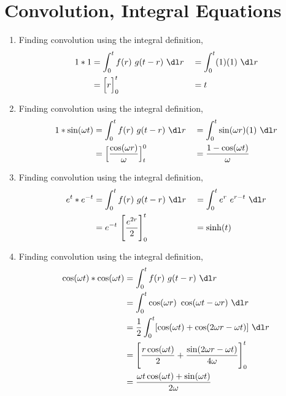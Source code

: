 \section{Convolution, Integral Equations}
\begin{enumerate}
    \item Finding convolution using the integral definition,
          \begin{align}
              1 * 1 & = \int_{0}^{t} f(r)\ g(t - r)\ \dl r &
                    & = \int_{0}^{t} (1)(1)\ \dl r           \\
                    & = \Big[ r \Big]_0^t                  &
                    & = t
          \end{align}

    \item Finding convolution using the integral definition,
          \begin{align}
              1 * \sin(\omega t) & = \int_{0}^{t} f(r)\ g(t - r)\ \dl r    &
                                 & = \int_{0}^{t} \sin(\omega r)(1)\ \dl r   \\
                                 & = \Big[ \frac{\cos(\omega r)}{\omega}
              \Big]_t^0          &
                                 & = \frac{1 - \cos(\omega t)}{\omega}
          \end{align}

    \item Finding convolution using the integral definition,
          \begin{align}
              e^t * e^{-t} & = \int_{0}^{t} f(r)\ g(t - r)\ \dl r         &
                           & = \int_{0}^{t} e^{r}\ e^{r - t}\ \dl r         \\
                           & = e^{-t}\ \Bigg[ \frac{e^{2r}}{2} \Bigg]_0^t &
                           & = \sinh(t)
          \end{align}

    \item Finding convolution using the integral definition,
          \begin{align}
              \cos(\omega t)
              * \cos(\omega t) & = \int_{0}^{t} f(r)\ g(t - r)\ \dl r             \\
                               & = \int_{0}^{t} \cos(\omega r)\
              \cos(\omega t - \omega r)\ \dl r                                    \\
                               & = \frac{1}{2}\int_{0}^{t} [\cos(\omega t)
              + \cos(2\omega r - \omega t)]\ \dl r                                \\
                               & = \Bigg[ \frac{r\cos(\omega t)}{2}
              + \frac{\sin(2\omega r - \omega t)}{4\omega} \Bigg]_0^t             \\
                               & = \frac{\omega t\cos(\omega t) + \sin(\omega t)}
              {2\omega}
          \end{align}


\end{enumerate}
